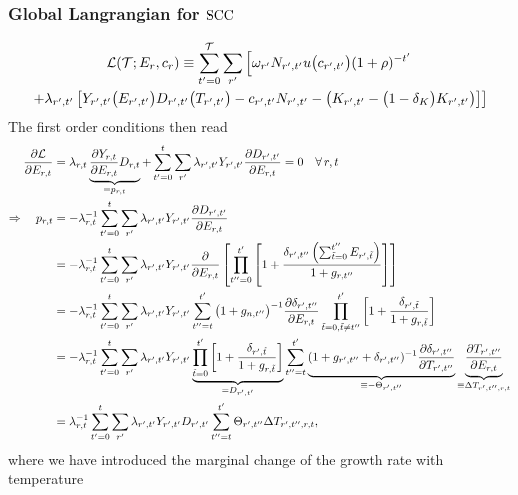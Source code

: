\documentclass[preprint,3p,authoryear]{elsarticle}
\begin{document}
\subsubsection{Global Langrangian for $\operatorname{SCC}$}
\label{sec:Lglob}
\begin{multline}
  \label{eq:Lglob} \mathcal{L}(\mathcal{T};E_r,c_r)\equiv\sum_{t'=0}^{\mathcal{T}}\sum_{r'}\left[\omega_{r'}N_{r',t'}u\big(c_{r',t'}\big)(1+\rho)^{-t'}\right.\\
  \left.+\lambda_{r',t'}\left[Y_{r',t'}\big(E_{r',t'}\big)D_{r',t'}\big(T_{r',t'}\big) -c_{r',t'}N_{r',t'}-\left(K_{r',t'}-\big(1-\delta_K\big)K_{r',t'}\right) \right]\right]
\end{multline}
The first order conditions then read
\begin{align}
  \label{eq:partE}
  \frac{\partial\mathcal{L}}{\partial E_{r,t}} &= \lambda_{r,t}\underbrace{\frac{\partial Y_{r,t}}{\partial E_{r,t}}D_{r,t}}_{=p_{r,t}}+\sum_{t'=0}^{t}\sum_{r'}\lambda_{r',t'}Y_{r',t'}\frac{\partial D_{r',t'}}{\partial E_{r,t}}=0\quad\forall\,r,t\notag\\
  \Rightarrow \quad p_{r,t} &= -\lambda_{r,t}^{-1}\sum_{t'=0}^{t}\sum_{r'}\lambda_{r',t'}Y_{r',t'}\frac{\partial D_{r',t'}}{\partial E_{r,t}}\notag\\
                                              &= -\lambda_{r,t}^{-1}\sum_{t'=0}^{t}\sum_{r'}\lambda_{r',t'}Y_{r',t'}\frac{\partial }{\partial E_{r,t}}\left[\prod_{t''=0}^{t'}\left[1+\frac{\delta_{r',t''}\left(\sum_{\tilde{t}=0}^{t''}E_{r',\tilde{t}}\right)}{1+g_{r,t''}} \right] \right]\notag\\
                                         &=-\lambda_{r,t}^{-1}\sum_{t'=0}^{t}\sum_{r'}\lambda_{r',t'}Y_{r',t'} \sum_{t''=t}^{t'}\big(1+g_{n,t''}\big)^{-1}\frac{\partial\delta_{r',t''}}{\partial E_{r,t}}\prod_{\tilde{t}=0,\tilde{t}\neq t''}^{t'}\left[1+\frac{\delta_{r',\tilde{t}}}{1+g_{r,\tilde{t}}} \right]\notag\\
                                         &=-\lambda_{r,t}^{-1}\sum_{t'=0}^{t}\sum_{r'}\lambda_{r',t'}Y_{r',t'}\underbrace{\prod_{\tilde{t}=0}^{t'}\left[1+\frac{\delta_{r',\tilde{t}}}{1+g_{r,\tilde{t}}}\right]}_{=D_{r',t'}}\sum_{t''=t}^{t'}\underbrace{(1+g_{r',t''}+\delta_{r',t''})^{-1}\frac{\partial\delta_{r',t''}}{\partial T_{r',t''}}}_{\equiv -\Theta_{r',t''}}\underbrace{\frac{\partial T_{r',t''}}{\partial E_{r,t}}}_{\equiv\Delta T_{r',t'',r,t}}\notag\\
&= \lambda_{r,t}^{-1}\sum_{t'=0}^{t}\sum_{r'}\lambda_{r',t'}Y_{r',t'}D_{r',t'}\sum_{t''=t}^{t'}\Theta_{r',t''}\Delta T_{r',t'',r,t},  
\end{align}
where we have introduced the marginal change of the growth rate with temperature
\end{document}
